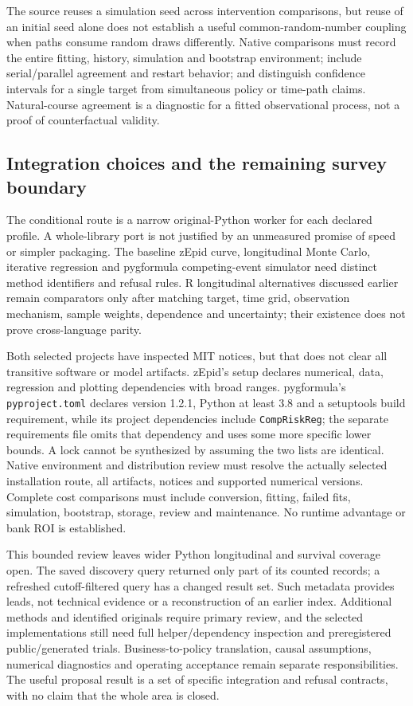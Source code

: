 The source reuses a simulation seed across intervention comparisons, but
reuse of an initial seed alone does not establish a useful common-random-number
coupling when paths consume random draws differently. Native comparisons
must record the entire fitting, history, simulation and bootstrap environment;
include serial/parallel agreement and restart behavior; and distinguish
confidence intervals for a single target from simultaneous policy or time-path
claims. Natural-course agreement is a diagnostic for a fitted observational
process, not a proof of counterfactual validity.
\citep{exec24_longpy_pygformula_source}

\subsection{Integration choices and the remaining survey boundary}
The conditional route is a narrow original-Python worker for each declared
profile. A whole-library port is not justified by an unmeasured promise of
speed or simpler packaging. The baseline zEpid curve, longitudinal Monte Carlo,
iterative regression and pygformula competing-event simulator need distinct
method identifiers and refusal rules. R longitudinal alternatives discussed
earlier remain comparators only after matching target, time grid, observation
mechanism, sample weights, dependence and uncertainty; their existence does
not prove cross-language parity.\citep{exec24_longpy_zepid_source,exec24_longpy_pygformula_source}

Both selected projects have inspected MIT notices, but that does not clear
all transitive software or model artifacts. zEpid's setup declares numerical,
data, regression and plotting dependencies with broad ranges. pygformula's
\texttt{pyproject.toml} declares version 1.2.1, Python at least 3.8 and a
setuptools build requirement, while its project dependencies include
\texttt{CompRiskReg}; the separate requirements file omits that dependency
and uses some more specific lower bounds. A lock cannot be synthesized by
assuming the two lists are identical. Native environment and distribution
review must resolve the actually selected installation route, all artifacts,
notices and supported numerical versions. Complete cost comparisons must
include conversion, fitting, failed fits, simulation, bootstrap, storage,
review and maintenance. No runtime advantage or bank ROI is established.
\citep{exec24_longpy_zepid_source,exec24_longpy_pygformula_source}

This bounded review leaves wider Python longitudinal and survival coverage
open. The saved discovery query returned only part of its counted records;
a refreshed cutoff-filtered query has a changed result set. Such metadata
provides leads, not technical evidence or a reconstruction of an earlier
index. Additional methods and identified originals require primary review,
and the selected implementations still need full helper/dependency inspection
and preregistered public/generated trials. Business-to-policy translation,
causal assumptions, numerical diagnostics and operating acceptance remain
separate responsibilities. The useful proposal result is a set of specific
integration and refusal contracts, with no claim that the whole area is closed.
